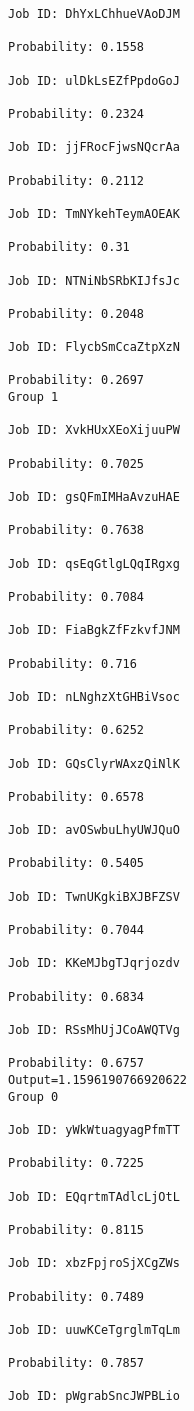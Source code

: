 \documentclass[11pt]{article}
\begin{document}
\begin{Verbatim}[commandchars=\\\{\}]
Job ID: DhYxLChhueVAoDJM

Probability: 0.1558

Job ID: ulDkLsEZfPpdoGoJ

Probability: 0.2324

Job ID: jjFRocFjwsNQcrAa

Probability: 0.2112

Job ID: TmNYkehTeymAOEAK

Probability: 0.31

Job ID: NTNiNbSRbKIJfsJc

Probability: 0.2048

Job ID: FlycbSmCcaZtpXzN

Probability: 0.2697
Group 1

Job ID: XvkHUxXEoXijuuPW

Probability: 0.7025

Job ID: gsQFmIMHaAvzuHAE

Probability: 0.7638

Job ID: qsEqGtlgLQqIRgxg

Probability: 0.7084

Job ID: FiaBgkZfFzkvfJNM

Probability: 0.716

Job ID: nLNghzXtGHBiVsoc

Probability: 0.6252

Job ID: GQsClyrWAxzQiNlK

Probability: 0.6578

Job ID: avOSwbuLhyUWJQuO

Probability: 0.5405

Job ID: TwnUKgkiBXJBFZSV

Probability: 0.7044

Job ID: KKeMJbgTJqrjozdv

Probability: 0.6834

Job ID: RSsMhUjJCoAWQTVg

Probability: 0.6757
Output=1.1596190766920622
Group 0

Job ID: yWkWtuagyagPfmTT

Probability: 0.7225

Job ID: EQqrtmTAdlcLjOtL

Probability: 0.8115

Job ID: xbzFpjroSjXCgZWs

Probability: 0.7489

Job ID: uuwKCeTgrglmTqLm

Probability: 0.7857

Job ID: pWgrabSncJWPBLio


\end{Verbatim}
\end{document}
